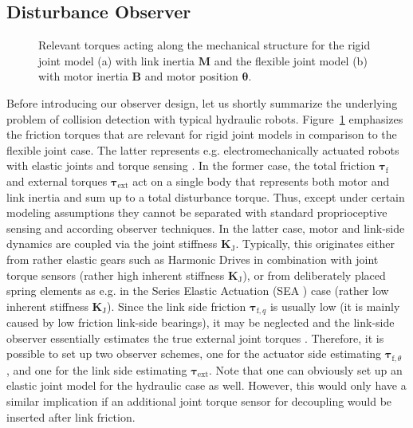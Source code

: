 \subsection{Disturbance Observer}
\label{sec:advance_observer}
%
\begin{figure}
\centering

\caption{Relevant torques acting along the mechanical structure for the rigid joint model (a) with link inertia $\bm{M}$ and the flexible joint model (b) with motor inertia $\bm{B}$ and motor position $\bm{\theta}$.}
\label{fig:rigid_flexible_joint_structure}
\SkipBeforeText
\end{figure}
%
Before introducing our observer design, let us shortly summarize the underlying problem of collision detection with typical hydraulic robots.
Figure~\ref{fig:rigid_flexible_joint_structure} emphasizes the friction torques that are relevant for rigid joint models in comparison to the flexible joint case.
The latter represents e.g. electromechanically actuated robots with elastic joints and torque sensing \cite{Ott2008}. 
In the former case, the total friction $\bm{\tau}_\mathrm{f}$ and external torques $\bm{\tau}_\mathrm{ext}$ act on a single body that represents both motor and link inertia and sum up to a total disturbance torque.
Thus, except under certain modeling assumptions they cannot be separated with standard proprioceptive sensing and according observer techniques. 
In the latter case, motor and link-side dynamics are coupled via the joint stiffness $\bm{K}_{\mathrm{J}}$.
Typically, this originates either from rather elastic gears such as Harmonic Drives in combination with joint torque sensors (rather high inherent stiffness $\bm{K}_{\mathrm{J}}$), or from deliberately placed spring elements as e.g. in the Series Elastic Actuation (SEA \cite{PrattWil1995}) case (rather low inherent stiffness $\bm{K}_{\mathrm{J}}$).
Since the link side friction $\bm{\tau}_{\mathrm{f},q}$ is usually low (it is mainly caused by low friction link-side bearings), it may be neglected and the link-side observer essentially estimates the true external joint torques \cite{Haddadin2014}.
Therefore, it is possible to set up two observer schemes, one for the actuator side estimating $\bm{\tau}_{\mathrm{f},\theta}$ \cite{LeTienAlbDeHir2008}, and one for the link side estimating $\bm{\tau}_\mathrm{ext}$.
Note that one can obviously set up an elastic joint model for the hydraulic case as well.
However, this would only have a similar implication if an additional joint torque sensor for decoupling would be inserted after link friction.

